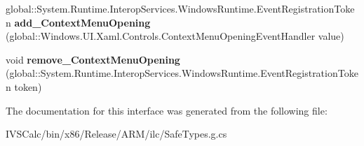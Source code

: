\begin{DoxyCompactItemize}
\item 
\mbox{\label{interface_windows_1_1_u_i_1_1_xaml_1_1_controls_1_1_i_text_box_a13a0570373297c92254b50875850cec9}} 
global\+::\+System.\+Runtime.\+Interop\+Services.\+Windows\+Runtime.\+Event\+Registration\+Token {\bfseries add\+\_\+\+Context\+Menu\+Opening} (global\+::\+Windows.\+U\+I.\+Xaml.\+Controls.\+Context\+Menu\+Opening\+Event\+Handler value)
\item 
\mbox{\label{interface_windows_1_1_u_i_1_1_xaml_1_1_controls_1_1_i_text_box_a51914ddc8aa63000ce56d9ef69853f43}} 
void {\bfseries remove\+\_\+\+Context\+Menu\+Opening} (global\+::\+System.\+Runtime.\+Interop\+Services.\+Windows\+Runtime.\+Event\+Registration\+Token token)
\end{DoxyCompactItemize}


The documentation for this interface was generated from the following file\+:\begin{DoxyCompactItemize}
\item 
I\+V\+S\+Calc/bin/x86/\+Release/\+A\+R\+M/ilc/Safe\+Types.\+g.\+cs\end{DoxyCompactItemize}
